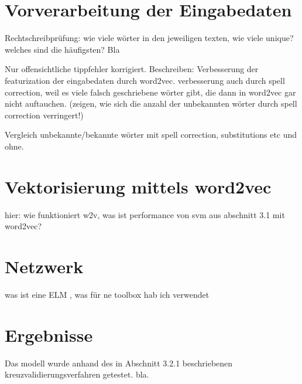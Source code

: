 \section{Vorverarbeitung der Eingabedaten}
Rechtschreibprüfung: wie viele wörter in den jeweiligen texten, wie viele unique? welches sind die häufigsten? Bla

Nur offensichtliche tippfehler korrigiert.
Beschreiben: Verbesserung der featurization der eingabedaten durch word2vec. verbesserung auch durch spell correction, weil es viele falsch geschriebene wörter gibt, die dann in word2vec gar nicht auftauchen. (zeigen, wie sich die anzahl der unbekannten wörter durch spell correction verringert!)

Vergleich unbekannte/bekannte wörter mit spell correction, substitutions etc und ohne.

\section{Vektorisierung mittels word2vec}
hier: wie funktioniert w2v, was ist performance von svm aus abschnitt 3.1 mit word2vec?

\section{Netzwerk}
was ist eine ELM \citep{huangExtremeLearningMachine2006}, was für ne toolbox hab ich verwendet \citep{akusokHighPerformanceExtremeLearning2015}

\section{Ergebnisse}
Das modell wurde anhand des in Abschnitt 3.2.1 beschriebenen kreuzvalidierungsverfahren getestet. bla.